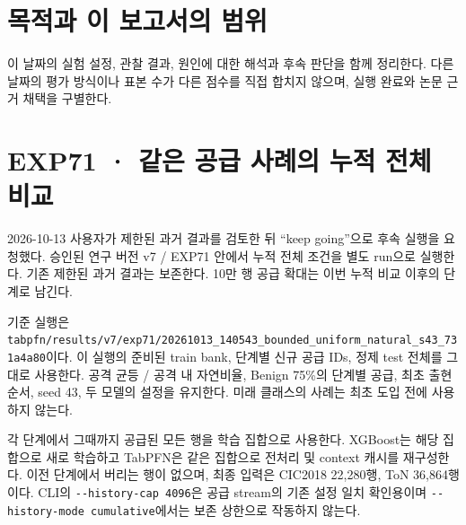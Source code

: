 




\section*{목적과 이 보고서의 범위}

이 날짜의 실험 설정, 관찰 결과, 원인에 대한 해석과 후속 판단을 함께 정리한다. 다른 날짜의 평가 방식이나 표본 수가 다른 점수를 직접 합치지 않으며, 실행 완료와 논문 근거 채택을 구별한다.


\section{EXP71 · 같은 공급 사례의 누적 전체 비교}
2026-10-13 사용자가 제한된 과거 결과를 검토한 뒤 “keep going”으로 후속 실행을 요청했다. 승인된 연구 버전 v7 /\allowbreak{} EXP71 안에서 누적 전체 조건을 별도 run으로 실행한다. 기존 제한된 과거 결과는 보존한다. 10만 행 공급 확대는 이번 누적 비교 이후의 단계로 남긴다.

기준 실행은 \texttt{tabpfn/\allowbreak{}\allowbreak{}r\allowbreak{}esults/\allowbreak{}\allowbreak{}v\allowbreak{}7/\allowbreak{}\allowbreak{}exp71/\allowbreak{}\allowbreak{}20261013\allowbreak{}\_\allowbreak{}\allowbreak{}140543\_\allowbreak{}\allowbreak{}bounded\_\allowbreak{}\allowbreak{}uniform\_\allowbreak{}\allowbreak{}natural\_\allowbreak{}\allowbreak{}s43\_\allowbreak{}\allowbreak{}731a\allowbreak{}4a80}이다. 이 실행의 준비된 train bank, 단계별 신규 공급 IDs, 정제 test 전체를 그대로 사용한다. 공격 균등 /\allowbreak{} 공격 내 자연비율, Benign 75\%의 단계별 공급, 최초 출현 순서, seed 43, 두 모델의 설정을 유지한다. 미래 클래스의 사례는 최초 도입 전에 사용하지 않는다.

각 단계에서 그때까지 공급된 모든 행을 학습 집합으로 사용한다. XGBoost는 해당 집합으로 새로 학습하고 TabPFN은 같은 집합으로 전처리 및 context 캐시를 재구성한다. 이전 단계에서 버리는 행이 없으며, 최종 입력은 CIC2018 22,280행, ToN 36,864행이다. CLI의 \texttt{-\allowbreak{}-\allowbreak{}histor\allowbreak{}y-\allowbreak{}cap 40\allowbreak{}96}은 공급 stream의 기존 설정 일치 확인용이며 \texttt{-\allowbreak{}-\allowbreak{}histor\allowbreak{}y-\allowbreak{}mode c\allowbreak{}umulativ\allowbreak{}e}에서는 보존 상한으로 작동하지 않는다.

